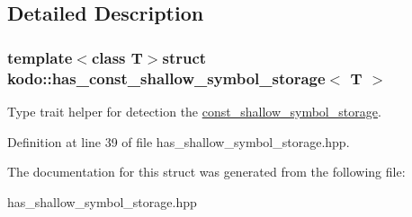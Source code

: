\subsection{Detailed Description}
\subsubsection*{template$<$class T$>$struct kodo\-::has\-\_\-const\-\_\-shallow\-\_\-symbol\-\_\-storage$<$ T $>$}

Type trait helper for detection the \hyperlink{classkodo_1_1const__shallow__symbol__storage}{const\-\_\-shallow\-\_\-symbol\-\_\-storage}. 

Definition at line 39 of file has\-\_\-shallow\-\_\-symbol\-\_\-storage.\-hpp.



The documentation for this struct was generated from the following file\-:\begin{DoxyCompactItemize}
\item 
has\-\_\-shallow\-\_\-symbol\-\_\-storage.\-hpp\end{DoxyCompactItemize}
